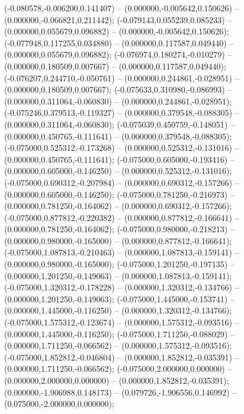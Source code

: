  (-0.080578,-0.006200,0.141407) -- (0.000000,-0.005642,0.150626) -- (0.000000,-0.066821,0.211442);
 (-0.079143,0.055239,0.085233) -- (0.000000,0.055679,0.096882) -- (0.000000,-0.005642,0.150626);
 (-0.077948,0.117255,0.034880) -- (0.000000,0.117587,0.049440) -- (0.000000,0.055679,0.096882);
 (-0.076974,0.180274,-0.010279) -- (0.000000,0.180509,0.007667) -- (0.000000,0.117587,0.049440);
 (-0.076207,0.244710,-0.050761) -- (0.000000,0.244861,-0.028951) -- (0.000000,0.180509,0.007667);
 (-0.075633,0.310980,-0.086993) -- (0.000000,0.311064,-0.060830) -- (0.000000,0.244861,-0.028951);
 (-0.075246,0.379513,-0.119327) -- (0.000000,0.379548,-0.088305) -- (0.000000,0.311064,-0.060830);
 (-0.075039,0.450759,-0.148051) -- (0.000000,0.450765,-0.111641) -- (0.000000,0.379548,-0.088305);
 (-0.075000,0.525312,-0.173268) -- (0.000000,0.525312,-0.131016) -- (0.000000,0.450765,-0.111641);
 (-0.075000,0.605000,-0.193416) -- (0.000000,0.605000,-0.146250) -- (0.000000,0.525312,-0.131016);
 (-0.075000,0.690312,-0.207984) -- (0.000000,0.690312,-0.157266) -- (0.000000,0.605000,-0.146250);
 (-0.075000,0.781250,-0.216973) -- (0.000000,0.781250,-0.164062) -- (0.000000,0.690312,-0.157266);
 (-0.075000,0.877812,-0.220382) -- (0.000000,0.877812,-0.166641) -- (0.000000,0.781250,-0.164062);
 (-0.075000,0.980000,-0.218213) -- (0.000000,0.980000,-0.165000) -- (0.000000,0.877812,-0.166641);
 (-0.075000,1.087813,-0.210463) -- (0.000000,1.087813,-0.159141) -- (0.000000,0.980000,-0.165000);
 (-0.075000,1.201250,-0.197135) -- (0.000000,1.201250,-0.149063) -- (0.000000,1.087813,-0.159141);
 (-0.075000,1.320312,-0.178228) -- (0.000000,1.320312,-0.134766) -- (0.000000,1.201250,-0.149063);
 (-0.075000,1.445000,-0.153741) -- (0.000000,1.445000,-0.116250) -- (0.000000,1.320312,-0.134766);
 (-0.075000,1.575312,-0.123674) -- (0.000000,1.575312,-0.093516) -- (0.000000,1.445000,-0.116250);
 (-0.075000,1.711250,-0.088029) -- (0.000000,1.711250,-0.066562) -- (0.000000,1.575312,-0.093516);
 (-0.075000,1.852812,-0.046804) -- (0.000000,1.852812,-0.035391) -- (0.000000,1.711250,-0.066562);
 (-0.075000,2.000000,0.000000) -- (0.000000,2.000000,0.000000) -- (0.000000,1.852812,-0.035391);
 (0.000000,-1.906988,0.148173) -- (0.079726,-1.906556,0.146992) -- (0.075000,-2.000000,0.000000);
